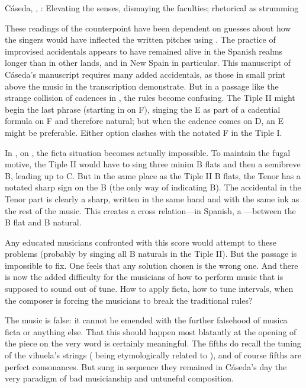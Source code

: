 {Cáseda, , : Elevating the senses,
dismaying the faculties; rhetorical  as strumming}

These readings of the counterpoint have been dependent on guesses about how the
singers would have inflected the written pitches using .
The practice of improvised accidentals appears to have remained alive in the
Spanish realms longer than in other lands, and in New Spain in particular. 
This manuscript of Cáseda's manuscript requires many added accidentals, as
those in small print above the music in the transcription demonstrate.
But in a passage like the strange collision of cadences in ,
the rules become confusing.
The Tiple II might begin the last phrase (starting in  on F),
singing the E as part of a cadential formula on F and therefore natural; but
when the cadence comes on D, an E\fl{} might be preferable. 
Either option clashes with the notated F\sh{} in the Tiple I.

In , on , the ficta situation becomes
actually impossible.
To maintain the fugal motive, the Tiple II would have to sing three minim B
flats and then a semibreve B\na, leading up to C.
But in the same place as the Tiple II B flats, the Tenor has a notated sharp
sign on the B (the only way of indicating B\na).
The accidental in the Tenor part is clearly a sharp, written in the same hand
and with the same ink as the rest of the music.
This creates a cross relation---in Spanish, a ---between
the B flat and B natural.

Any educated musicians confronted with this score would attempt to 
these problems (probably by singing all B naturals in the Tiple II).
But the passage is impossible to fix.
One feels that any solution chosen is the wrong one.
And there is now the added difficulty for the musicians of how to perform music
that is supposed to sound out of tune.
How to apply ficta, how to tune intervals, when the composer is forcing the
musicians to break the traditional rules?

The music is false: it cannot be emended with the further falsehood of musica
ficta or anything else.
That this should happen most blatantly at the opening of the piece on the very
word  is certainly meaningful.
The fifths do recall the tuning of the vihuela's strings (
being etymologically related to ), and of course fifths are
perfect consonances.
But sung in sequence they remained in Cáseda's day the very paradigm of bad
musicianship and untuneful composition.

